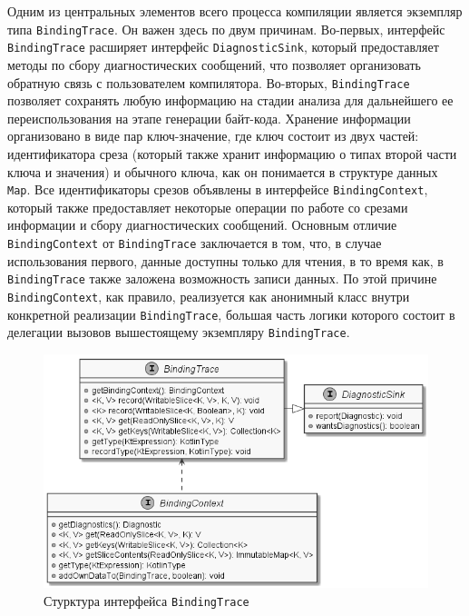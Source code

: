  Одним из центральных элементов всего процесса компиляции является экземпляр типа \lstinline{BindingTrace}. Он важен здесь по двум причинам. Во-первых, интерфейс \lstinline{BindingTrace} расширяет интерфейс \lstinline{DiagnosticSink}, который предоставляет методы по сбору диагностических сообщений, что позволяет организовать обратную связь с пользователем компилятора. Во-вторых, \lstinline{BindingTrace} позволяет сохранять любую информацию на стадии анализа для дальнейшего ее переиспользования на этапе генерации байт-кода. Хранение информации организовано в виде пар ключ-значение, где ключ состоит из двух частей: идентификатора среза (который также хранит информацию о типах второй части ключа и значения) и обычного ключа, как он понимается в структуре данных \lstinline{Map}. Все идентификаторы срезов объявлены в интерфейсе \lstinline{BindingContext}, который также предоставляет некоторые операции по работе со срезами информации и сбору диагностических сообщений. Основным отличие \lstinline{BindingContext} от \lstinline{BindingTrace} заключается в том, что, в случае использования первого, данные доступны только для чтения, в то время как, в \lstinline{BindingTrace} также заложена возможность записи данных. По этой причине \lstinline{BindingContext}, как правило, реализуется как анонимный класс внутри конкретной реализации \lstinline{BindingTrace}, большая часть логики которого состоит в делегации вызовов вышестоящему экземпляру \lstinline{BindingTrace}.   

\begin{figure}[htbp]
    \centering
    \includegraphics[width=\textwidth]{resources/06/04_binding_context.png}
    \caption{Стурктура интерфейса \lstinline{BindingTrace}}
    \label{fig05:binding-trace-scheme}
\end{figure}

